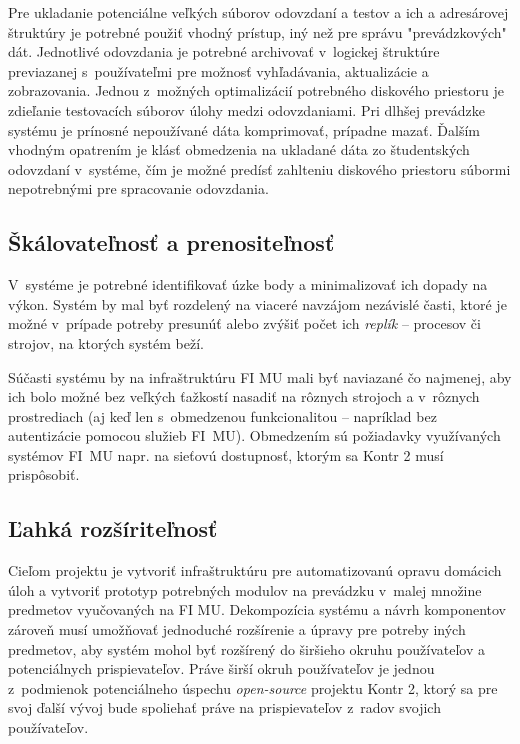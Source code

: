 \documentclass[
  digital, %
  oneside, %
  table,   %
  lof,     %
  lot,   %
]{fithesis3}
\begin{document}
Pre ukladanie potenciálne veľkých súborov odovzdaní a testov a ich a adresárovej štruktúry je potrebné použiť vhodný prístup, iný než pre správu "prevádzkových" dát. Jednotlivé odovzdania je potrebné archivovať v~logickej štruktúre previazanej s~používateľmi pre možnosť vyhľadávania, aktualizácie a zobrazovania. Jednou z~možných optimalizácií potrebného diskového priestoru je zdieľanie testovacích súborov úlohy medzi odovzdaniami. Pri dlhšej prevádzke systému je prínosné nepoužívané dáta komprimovať, prípadne mazať. Ďalším vhodným opatrením je klásť obmedzenia na ukladané dáta zo študentských odovzdaní v~systéme, čím je možné predísť zahlteniu diskového priestoru súbormi nepotrebnými pre spracovanie odovzdania.

\subsection{Škálovateľnosť a prenositeľnosť}

V~systéme je potrebné identifikovať úzke body a minimalizovať ich dopady na výkon. Systém by mal byť rozdelený na viaceré navzájom nezávislé časti, ktoré je možné v~prípade potreby presunúť alebo zvýšiť počet ich \emph{replík} -- procesov či strojov, na ktorých systém beží. 

Súčasti systému by na infraštruktúru FI MU mali byť naviazané čo najmenej, aby ich bolo možné bez veľkých ťažkostí nasadiť na rôznych strojoch a v~rôznych prostrediach (aj keď len s~obmedzenou funkcionalitou -- napríklad bez autentizácie pomocou služieb FI~MU). Obmedzením sú požiadavky využívaných systémov FI~MU napr. na sieťovú dostupnosť, ktorým sa Kontr 2 musí prispôsobiť.

\subsection{Ľahká rozšíriteľnosť}

Cieľom projektu je vytvoriť infraštruktúru pre automatizovanú opravu domácich úloh a vytvoriť prototyp potrebných modulov na prevádzku v~malej množine predmetov vyučovaných na FI MU. Dekompozícia systému a návrh komponentov zároveň musí umožňovať jednoduché rozšírenie a úpravy pre potreby iných predmetov, aby systém mohol byť rozšírený do širšieho okruhu používateľov a potenciálnych prispievateľov. Práve širší okruh používateľov je jednou z~podmienok potenciálneho úspechu \emph{open-source} projektu Kontr 2, ktorý sa pre svoj ďalší vývoj bude spoliehať práve na prispievateľov z~radov svojich používateľov.
\end{document}
